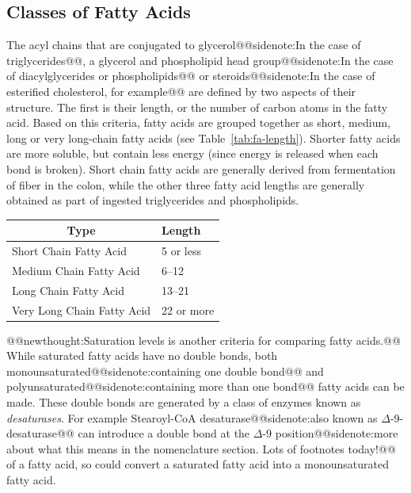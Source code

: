 \documentclass{tufte-handout}
\makeatletter
\def\newthought#1{@@newthought:#1@@}
\def\sidenote#1{@@sidenote:#1@@}
\makeatother
\begin{document}
\subsection{Classes of Fatty Acids}

The acyl chains that are conjugated to glycerol\sidenote{In the case of triglycerides}, a glycerol and phospholipid head group\sidenote{In the case of diacylglycerides or phospholipids} or steroids\sidenote{In the case of esterified cholesterol, for example} are defined by two aspects of their structure.  The first is their length, or the number of carbon atoms in the fatty acid.  Based on this criteria, fatty acids are grouped together as short, medium, long or very long-chain fatty acids (see Table~\ref{tab:fa-length}).  Shorter fatty acids are more soluble, but contain less energy (since energy is released when each bond is broken).  Short chain fatty acids are generally derived from fermentation of fiber in the colon, while the other three fatty acid lengths are generally obtained as part of ingested triglycerides and phospholipids.

\begin{margintable}
\centering
\caption{Classification of fatty acids by length of the fatty acid tail}\label{tab:fa-length}
\begin{tabular}{ll}
\hline
\multicolumn{1}{c}{\textbf{Type}} & \textbf{Length} \\ \hline
Short Chain Fatty Acid            & 5 or less       \\
Medium Chain Fatty Acid           & 6--12            \\
Long Chain Fatty Acid             & 13--21           \\
Very Long Chain Fatty Acid        & 22 or more     
\end{tabular}
\end{margintable}

\newthought{Saturation levels is another criteria for comparing fatty acids.}  While saturated fatty acids have no double bonds, both monounsaturated\sidenote{containing one double bond} and polyunsaturated\sidenote{containing more than one bond} fatty acids can be made.  These double bonds are generated by a class of enzymes known as \emph{desaturases}.  For example Stearoyl-CoA desaturase\sidenote{also known as $\Delta$-9-desaturase} can introduce a double bond at the $\Delta$-9 position\sidenote{more about what this means in the nomenclature section.  Lots of footnotes today!} of a fatty acid, so could convert a saturated fatty acid into a monounsaturated fatty acid.
\end{document}
